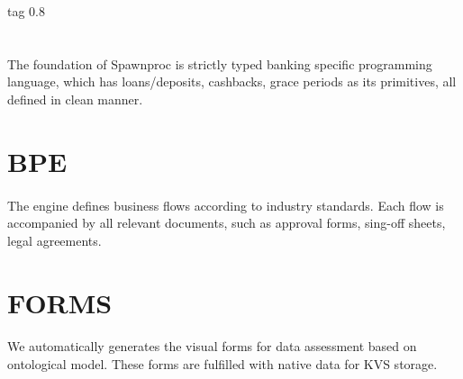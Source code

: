 \documentclass[11pt]{article}
\begin{document}
 tag 0.8


\section*{}
\paragraph{}
The foundation of Spawnproc is strictly typed banking specific
programming language, which has loans/deposits, cashbacks,
grace periods as its primitives, all defined in clean manner.


\section*{BPE}
\paragraph{}
The engine defines business flows according to industry standards.
Each flow is accompanied by all relevant documents, such as
approval forms, sing-off sheets, legal agreements.


\section*{FORMS}
\paragraph{}
We automatically generates the visual forms for data assessment
based on ontological model. These forms are fulfilled with native
data for KVS storage.

\end{document}
